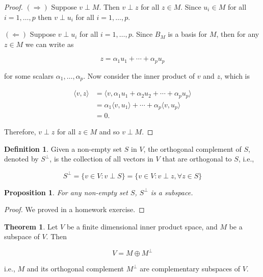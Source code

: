 \documentclass[12pt]{article}
\newtheorem*{proposition}{Proposition}
\theoremstyle{definition}
\newtheorem*{definition}{Definition}
\newtheorem{theorem}{Theorem}[section]  %
\begin{document}
\begin{proof}
$(\Rightarrow)$ Suppose $v \perp M$. Then $v \perp z$ for all $z \in M$. Since $u_i \in M$ for all 
$i = 1, \ldots, p$ then $v \perp u_i$ for all $i = 1, \ldots, p$.

$(\Leftarrow)$ Suppose $v \perp u_i$ for all $i = 1, \ldots, p$. Since $B_M$ is a basis for
$M$, then for any $z \in M$ we can write as

\[z = \alpha_1 u_1 + \cdots + \alpha_p u_p\]

for some scalars $\alpha_1, \ldots, \alpha_p$. Now consider the inner product of $v$ and $z$,
which is

\begin{align*}
\langle v, z \rangle &= \langle v, \alpha_1 u_1 + \alpha_2 u_2 + \cdots + \alpha_p u_p \rangle \\
&= \alpha_1 \langle v, u_1 \rangle + \cdots + \alpha_p \langle v, u_p \rangle \\
&= 0.
\end{align*}

Therefore, $v \perp z$ for all $z \in M$ and so $v \perp M$.
\end{proof}

\begin{definition}
Given a non-empty set $S$ in $V$, the orthogonal complement of $S$, denoted by $S^{\perp}$,
is the collection of all vectors in $V$ that are orthogonal to $S$, i.e.,

\[S^{\perp} = \{v \in V : v \perp S \} = \{v \in V : v \perp z, \forall z \in S\}\]
\end{definition}

\begin{proposition}
For any non-empty set $S$, $S^{\perp}$ is a subspace.
\end{proposition}

\begin{proof}
We proved in a homework exercise.
\end{proof}

\begin{theorem}
Let $V$ be a finite dimensional inner product space, and $M$ be a subspace of $V$. Then

\[V = M \oplus M^{\perp} \]

i.e., $M$ and its orthogonal complement $M^{\perp}$ are complementary subspaces of $V$.
\end{theorem}
\end{document}
